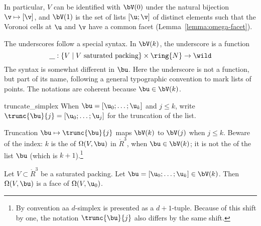 In particular, $V$ can be identified with $\bV(0)$ under the natural
bijection $\v\mapsto[\v]$, and $\bV(1)$ is the set of lists $[\u;\v]$
of distinct elements such that the Voronoi cells at $ \u$ and $\v$
have a common facet (Lemma~\ref{lemma:omega-facet}).  

\begin{notation}[underscore]
  The underscores follow a special syntax.  In $\bV(k)$, the
  underscore is a function
\[  
\underline{\phantom V}:\{V \mid \text{$V$ saturated packing} \}
\times \ring{N} \to \wild
\] 
 The syntax is somewhat different in $\bu$.  Here the
underscore is not a function, but part of its name, following a
general typographic convention to mark lists of points. The notations
are coherent because $\bu\in\bV(k)$.
\end{notation}

\begin{notation}[$\trunc{\bu}{j}$]
%
 {truncate\_simplex}
When $\bu=[\u_0;\ldots;\u_k]$ and $j\le k$, write
$\trunc{\bu}{j} = 
[\u_0;\ldots;\u_j]$ for the truncation of the list.  
%
\end{notation}

Truncation $\bu\mapsto\trunc{\bu}{j}$ maps $\bV(k)$ to $\bV(j)$ when
$j\le k$.  Beware of the index: $k$ is the  of
$\Omega(V,\bu)$ in $\ring{R}^3$, when $\bu\in \bV(k)$; it is not the
 of the list $\bu$ (which is $k+1$).\footnote{By
  convention aa $d$-simplex is presented as a $d+1$-tuple.  Because of
  this shift by one, the notation $\trunc{\bu}{j}$ also differs by the
  same shift.}


\begin{lemma}\label{lemma:omega-face}  
Let $V\subset\ring{R}^3$ be a saturated packing.
Let $\bu=[\u_0;\ldots;\u_{k}]\in \bV(k)$.  
Then $\Omega(V,\bu)$ is a face of $\Omega(V,\u_0)$.
\end{lemma}

